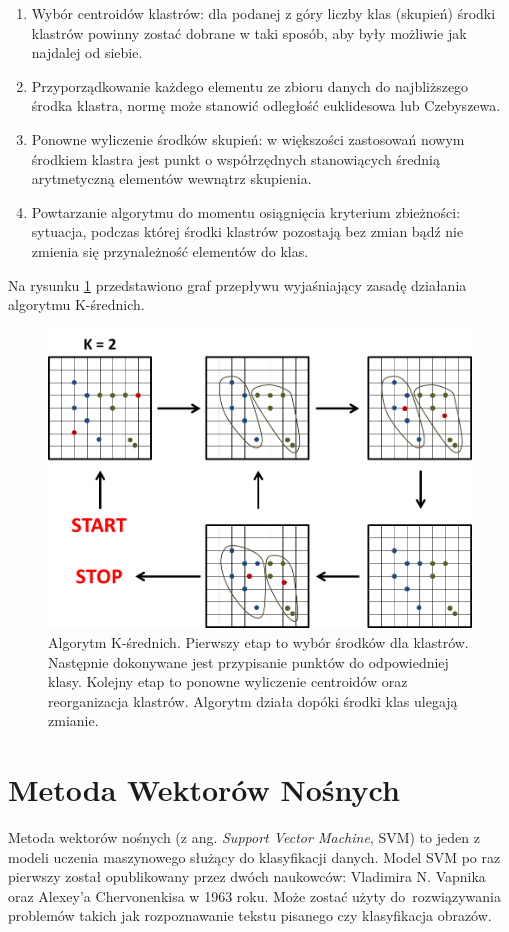 \begin{enumerate}
	\item Wybór centroidów klastrów: dla podanej z góry liczby klas (skupień) środki klastrów powinny zostać dobrane w taki sposób, aby były możliwie jak najdalej od siebie.
	\item Przyporządkowanie każdego elementu ze zbioru danych do najbliższego środka klastra, normę może stanowić odległość euklidesowa lub Czebyszewa.
	\item Ponowne wyliczenie środków skupień: w większości zastosowań nowym środkiem klastra jest punkt o współrzędnych stanowiących średnią arytmetyczną elementów wewnątrz skupienia.
	\item Powtarzanie algorytmu do momentu osiągnięcia kryterium zbieżności: sytuacja, podczas której środki klastrów pozostają bez zmian bądź nie zmienia się przynależność elementów do klas.
\end{enumerate}

Na rysunku \ref{im: Clustering} przedstawiono graf przepływu wyjaśniający zasadę działania algorytmu K-średnich.
\begin{figure}[h]
	\includegraphics[width=16cm]{Clustering1}
	\centering
	\caption{Algorytm K-średnich. Pierwszy etap to wybór środków dla klastrów. Następnie dokonywane jest przypisanie punktów do odpowiedniej klasy. Kolejny etap to ponowne wyliczenie centroidów oraz reorganizacja klastrów. Algorytm działa dopóki środki klas ulegają zmianie.}
	\label{im: Clustering}
\end{figure}

\section{Metoda Wektorów Nośnych}
\label{sec: SVM}
Metoda wektorów nośnych (z ang. \textit{Support Vector Machine}, SVM) to jeden z modeli uczenia maszynowego służący do klasyfikacji danych. Model SVM po raz pierwszy został opublikowany przez dwóch naukowców: Vladimira N. Vapnika oraz Alexey'a Chervonenkisa w 1963 roku. Może zostać użyty do~rozwiązywania problemów takich jak rozpoznawanie tekstu pisanego czy klasyfikacja obrazów.

